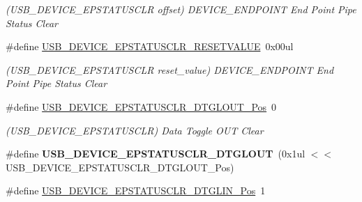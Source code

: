 \begin{DoxyCompactItemize}
\begin{DoxyCompactList}\small\item\em (U\+S\+B\+\_\+\+D\+E\+V\+I\+C\+E\+\_\+\+E\+P\+S\+T\+A\+T\+U\+S\+C\+L\+R offset) D\+E\+V\+I\+C\+E\+\_\+\+E\+N\+D\+P\+O\+I\+N\+T End Point Pipe Status Clear \end{DoxyCompactList}\item 
\hypertarget{group___s_a_m_l21___u_s_b_ga1d9620d0a60feafe445c2faa90c97e18}{}\#define \hyperlink{group___s_a_m_l21___u_s_b_ga1d9620d0a60feafe445c2faa90c97e18}{U\+S\+B\+\_\+\+D\+E\+V\+I\+C\+E\+\_\+\+E\+P\+S\+T\+A\+T\+U\+S\+C\+L\+R\+\_\+\+R\+E\+S\+E\+T\+V\+A\+L\+U\+E}~0x00ul\label{group___s_a_m_l21___u_s_b_ga1d9620d0a60feafe445c2faa90c97e18}

\begin{DoxyCompactList}\small\item\em (U\+S\+B\+\_\+\+D\+E\+V\+I\+C\+E\+\_\+\+E\+P\+S\+T\+A\+T\+U\+S\+C\+L\+R reset\+\_\+value) D\+E\+V\+I\+C\+E\+\_\+\+E\+N\+D\+P\+O\+I\+N\+T End Point Pipe Status Clear \end{DoxyCompactList}\item 
\hypertarget{group___s_a_m_l21___u_s_b_ga428a40dc91d2b4e26bc2bc727d9767ec}{}\#define \hyperlink{group___s_a_m_l21___u_s_b_ga428a40dc91d2b4e26bc2bc727d9767ec}{U\+S\+B\+\_\+\+D\+E\+V\+I\+C\+E\+\_\+\+E\+P\+S\+T\+A\+T\+U\+S\+C\+L\+R\+\_\+\+D\+T\+G\+L\+O\+U\+T\+\_\+\+Pos}~0\label{group___s_a_m_l21___u_s_b_ga428a40dc91d2b4e26bc2bc727d9767ec}

\begin{DoxyCompactList}\small\item\em (U\+S\+B\+\_\+\+D\+E\+V\+I\+C\+E\+\_\+\+E\+P\+S\+T\+A\+T\+U\+S\+C\+L\+R) Data Toggle O\+U\+T Clear \end{DoxyCompactList}\item 
\hypertarget{group___s_a_m_l21___u_s_b_ga4be58b5bcf058e066f56c6f6f0aa5e0b}{}\#define {\bfseries U\+S\+B\+\_\+\+D\+E\+V\+I\+C\+E\+\_\+\+E\+P\+S\+T\+A\+T\+U\+S\+C\+L\+R\+\_\+\+D\+T\+G\+L\+O\+U\+T}~(0x1ul $<$$<$ U\+S\+B\+\_\+\+D\+E\+V\+I\+C\+E\+\_\+\+E\+P\+S\+T\+A\+T\+U\+S\+C\+L\+R\+\_\+\+D\+T\+G\+L\+O\+U\+T\+\_\+\+Pos)\label{group___s_a_m_l21___u_s_b_ga4be58b5bcf058e066f56c6f6f0aa5e0b}

\item 
\hypertarget{group___s_a_m_l21___u_s_b_ga6045e554a81e2834adc726c084f4f40e}{}\#define \hyperlink{group___s_a_m_l21___u_s_b_ga6045e554a81e2834adc726c084f4f40e}{U\+S\+B\+\_\+\+D\+E\+V\+I\+C\+E\+\_\+\+E\+P\+S\+T\+A\+T\+U\+S\+C\+L\+R\+\_\+\+D\+T\+G\+L\+I\+N\+\_\+\+Pos}~1\label{group___s_a_m_l21___u_s_b_ga6045e554a81e2834adc726c084f4f40e}


\end{DoxyCompactItemize}
